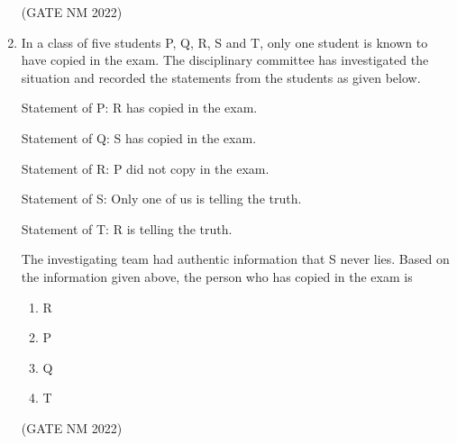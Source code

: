 \documentclass[journal,12pt,onecolumn]{IEEEtran}
\theoremstyle{remark}
\begin{document}
\begin{enumerate}
\hfill(GATE NM 2022)

\item  In a class of five students P, Q, R, S and T, only one student is known to have copied in the exam. The disciplinary committee has investigated the situation and recorded the statements from the students as given below.  

{Statement of P:} R has copied in the exam.  

{Statement of Q:} S has copied in the exam.  

{Statement of R:} P did not copy in the exam.  

{Statement of S:} Only one of us is telling the truth.  

{Statement of T:} R is telling the truth.  

The investigating team had authentic information that S never lies.  
Based on the information given above, the person who has copied in the exam is  
\begin{multicols}{4}
\begin{enumerate}
    \item R
    \item P
    \item Q
    \item T
\end{enumerate}
\end{multicols}

\hfill(GATE NM 2022)


\end{enumerate}
\end{document}
